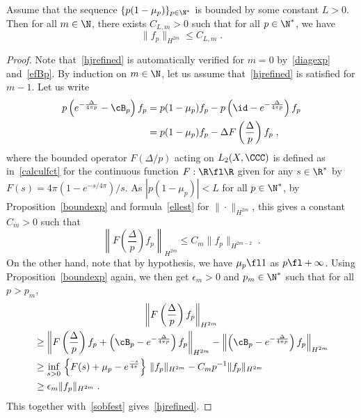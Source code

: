 \begin{lemm}\label{hjrefprop}
Assume that the sequence $\{p(1-\mu_p)\}_{p\in\N^*}$ is bounded by some constant $L>0$. Then for all $m\in\N$, there exists $C_{L,m}>0$ such that for all $p\in\N^*$, we have
\begin{equation}\label{hjrefined}
\|f_p\|_{H^{2m}}\leq C_{L,m}\;.
\end{equation}
\end{lemm}
\begin{proof}
Note that~\eqref{hjrefined} is automatically verified for $m=0$ by~\eqref{diagexp} and~\eqref{efBp}. By induction on $m\in\N$, let us assume that~\eqref{hjrefined} is satisfied for $m-1$. Let us write
\begin{equation}\label{deltFest}
\begin{split}
p\left(e^{-\frac{\Delta}{4\pi p}}-\cB_p\right)f_p&=p(1-\mu_p)f_p- p\left(\id-e^{-\frac{\Delta}{4\pi p}}\right)f_p\\
&=p(1-\mu_p)f_p-\Delta F\left(\frac{\Delta}{p}\right)f_p\;,
\end{split}
\end{equation}
where the bounded operator $F(\Delta/p)$ acting on $L_2(X,\CCC)$ is defined as in~\eqref{calculfct} for the continuous function $F:\R\fl\R$ given for any $s\in\R^*$ by $F(s)=4\pi(1-e^{-s/4\pi})/s$. As $|p(1-\mu_p)|<L$ for all $p\in\N^*$, by Proposition~\ref{boundexp} and formula~\eqref{ellest} for $\|\cdot\|_{H^{2m}}$, this gives a constant $C_m>0$ such that
\begin{equation}\label{sobfest}
\left\|F\left(\frac{\Delta}{p}\right)f_p\right\|_{H^{2m}}\leq C_m\|f_p\|_{H^{2m-2}}\;.
\end{equation}
On the other hand, note that by hypothesis, we have $\mu_p\fl 1$ as $p\fl+\infty$. Using Proposition~\ref{boundexp} again, we then get $\epsilon_m>0$ and $p_m\in\N^*$ such that for all $p>p_m$,
\begin{multline}\label{hjdeltFest}
\left\|F\left(\frac{\Delta}{p}\right)f_p\right\|_{H^{2m}}\\
\begin{aligned}
&\geq\left\|F\left(\frac{\Delta}{p}\right)f_p+\left(\cB_p-e^{-\frac{\Delta}{4\pi p}}\right)f_p\right\|_{H^{2m}} -\left\|\left(\cB_p-e^{-\frac{\Delta}{4\pi p}}\right)f_p\right\|_{H^{2m}}\\
&\geq\inf_{s>0}\,\left\{F(s)+\mu_p-e^{\frac{-s}{4\pi}}\right\}\,\|f_p\|_{H^{2m}} -C_m p^{-1}\|f_p\|_{H^{2m}}\\
&\geq\epsilon_m\|f_p\|_{H^{2m}}\;.
\end{aligned}
\end{multline}
This together with~\eqref{sobfest} gives~\eqref{hjrefined}.
\end{proof}



